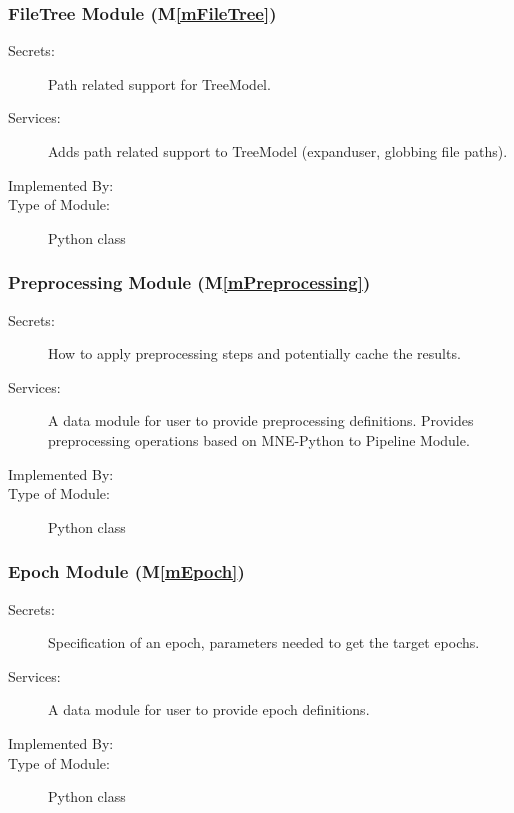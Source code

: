 \documentclass[12pt, titlepage]{article}
\newcommand{\mref}[1]{M\ref{#1}}
\begin{document}
\subsubsection{FileTree Module (\mref{mFileTree})}


\begin{description}
    \item[Secrets:] Path related support for TreeModel.
    \item[Services:] Adds path related support to TreeModel (expanduser, globbing file paths).
    \item[Implemented By:] \progname
    \item[Type of Module:] Python class
\end{description}




\subsubsection{Preprocessing Module (\mref{mPreprocessing})}


\begin{description}
    \item[Secrets:] How to apply preprocessing steps and potentially cache the results.
    \item[Services:] A data module for user to provide preprocessing definitions. Provides preprocessing operations based on MNE-Python to Pipeline Module.
    \item[Implemented By:] \progname
    \item[Type of Module:] Python class
\end{description}




\subsubsection{Epoch Module (\mref{mEpoch})}


\begin{description}
    \item[Secrets:] Specification of an epoch, parameters needed to get the target epochs.
    \item[Services:] A data module for user to provide epoch definitions.
    \item[Implemented By:] \progname
    \item[Type of Module:] Python class
\end{description}
\end{document}
